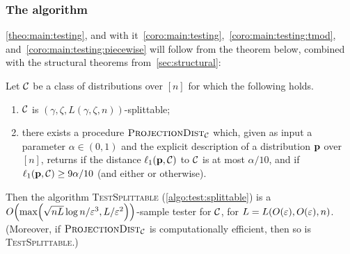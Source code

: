 \subsubsection{The algorithm}\label{ssec:main:algorithm}

\cref{theo:main:testing}, and with it~\cref{coro:main:testing},~\cref{coro:main:testing:tmod}, and~\cref{coro:main:testing:piecewise} will follow from the theorem below, combined with the structural theorems from~\cref{sec:structural}:
\begin{theorem}\label{theo:main:testing:detailed}
  Let $\class$ be a class of distributions over $[n]$ for which the following holds. 
    \begin{enumerate}
      \item $\class$ is $(\gamma, \zeta,L(\gamma,\zeta,n))$-splittable;
      \item there exists a procedure $\estimdist$ which, given as input a parameter $\alpha\in(0,1)$ and the explicit description of a distribution $\D$ over $[n]$, 
      returns \yes if the distance $\lp[1](\D,\class)$ to $\class$ is at most $\alpha/10$, and \no if $\lp[1](\D,\class) \geq 9\alpha/10$ (and either \yes or \no otherwise).
    \end{enumerate}
  Then the algorithm \textsc{TestSplittable} (\cref{algo:test:splittable}) is a $\bigO{ \max\mleft({\sqrt{nL}}\log n/{\eps^3}, L/{\eps^2}\mright) }$-sample tester for $\class$, for $L=L(O(\eps),O(\eps),n)$. 
  (Moreover, if $\estimdist$ is computationally efficient, then so is \textsc{TestSplittable}.)
\end{theorem}

